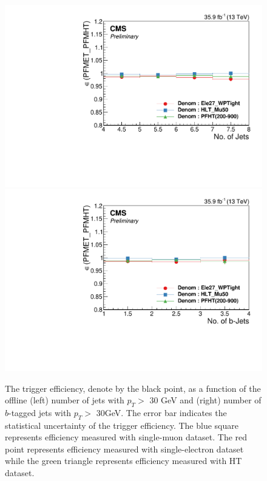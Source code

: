 \begin{figure}[tbp]
 \begin{center}
   \includegraphics[width=0.49\linewidth]{sections/mc4/EvtSelSBOpt/figures/TrigNJets.pdf}
   \includegraphics[width=0.49\linewidth]{sections/mc4/EvtSelSBOpt/figures/TrigNBs.pdf}
   \caption{ The trigger efficiency, denote by the black point, as a function
		 of the offline (left) number of jets with $p_{T}>$ 30 GeV and (right) number
		 of $b$-tagged jets with $p_{T}>$ 30GeV. The error bar indicates the
   statistical uncertainty of the trigger efficiency. The blue square
   represents efficiency measured with single-muon dataset.  The red point
   represents efficiency measured with single-electron dataset while the green
   triangle represents efficiency measured with HT dataset.}
   \label{fig:TrigMETJets}
 \end{center}
\end{figure}

